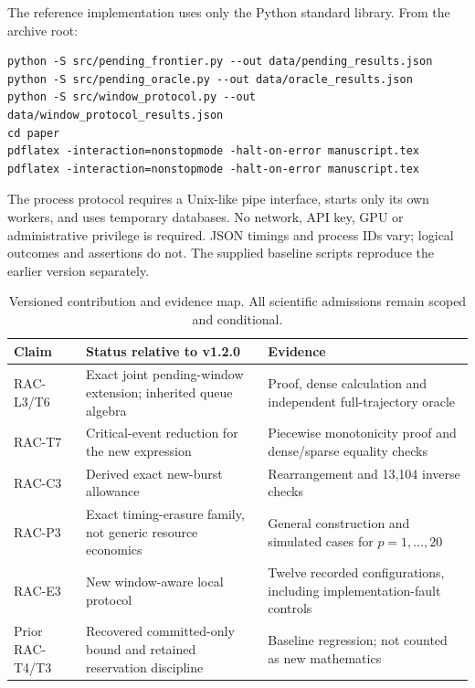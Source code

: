 The reference implementation uses only the Python standard library. From the archive root:
\begin{lstlisting}
python -S src/pending_frontier.py --out data/pending_results.json
python -S src/pending_oracle.py --out data/oracle_results.json
python -S src/window_protocol.py --out data/window_protocol_results.json
cd paper
pdflatex -interaction=nonstopmode -halt-on-error manuscript.tex
pdflatex -interaction=nonstopmode -halt-on-error manuscript.tex
\end{lstlisting}
The process protocol requires a Unix-like pipe interface, starts only its own workers, and uses temporary databases. No network, API key, GPU or administrative privilege is required. JSON timings and process IDs vary; logical outcomes and assertions do not. The supplied baseline scripts reproduce the earlier version separately.

\begin{table}[ht]
\centering\small
\caption{Versioned contribution and evidence map. All scientific admissions remain scoped and conditional.}
\begin{tabularx}{\linewidth}{@{}lXX@{}}\toprule
Claim & Status relative to v1.2.0 & Evidence\\\midrule
RAC-L3/T6 & Exact joint pending-window extension; inherited queue algebra & Proof, dense calculation and independent full-trajectory oracle\\
RAC-T7 & Critical-event reduction for the new expression & Piecewise monotonicity proof and dense/sparse equality checks\\
RAC-C3 & Derived exact new-burst allowance & Rearrangement and 13,104 inverse checks\\
RAC-P3 & Exact timing-erasure family, not generic resource economics & General construction and simulated cases for $p=1,\ldots,20$\\
RAC-E3 & New window-aware local protocol & Twelve recorded configurations, including implementation-fault controls\\
Prior RAC-T4/T3 & Recovered committed-only bound and retained reservation discipline & Baseline regression; not counted as new mathematics\\\bottomrule
\end{tabularx}
\end{table}

